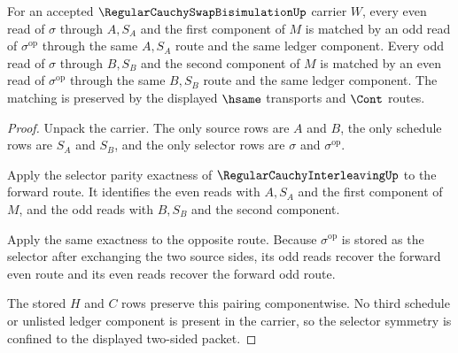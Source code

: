 \begin{theorem}
\label{thm:regular-cauchy-swap-bisimulation-selector-symmetry}
For an accepted $\RegularCauchySwapBisimulationUp$ carrier $W$, every even read of $\sigma$ through $A,S_A$ and the first component of $M$ is matched by an odd read of $\sigma^{\mathrm{op}}$ through the same $A,S_A$ route and the same ledger component. Every odd read of $\sigma$ through $B,S_B$ and the second component of $M$ is matched by an even read of $\sigma^{\mathrm{op}}$ through the same $B,S_B$ route and the same ledger component. The matching is preserved by the displayed $\hsame$ transports and $\Cont$ routes.
\end{theorem}
\begin{proof}
Unpack the carrier. The only source rows are $A$ and $B$, the only schedule rows are $S_A$ and $S_B$, and the only selector rows are $\sigma$ and $\sigma^{\mathrm{op}}$.

Apply the selector parity exactness of $\RegularCauchyInterleavingUp$ to the forward route. It identifies the even reads with $A,S_A$ and the first component of $M$, and the odd reads with $B,S_B$ and the second component.

Apply the same exactness to the opposite route. Because $\sigma^{\mathrm{op}}$ is stored as the selector after exchanging the two source sides, its odd reads recover the forward even route and its even reads recover the forward odd route.

The stored $H$ and $C$ rows preserve this pairing componentwise. No third schedule or unlisted ledger component is present in the carrier, so the selector symmetry is confined to the displayed two-sided packet.
\end{proof}

